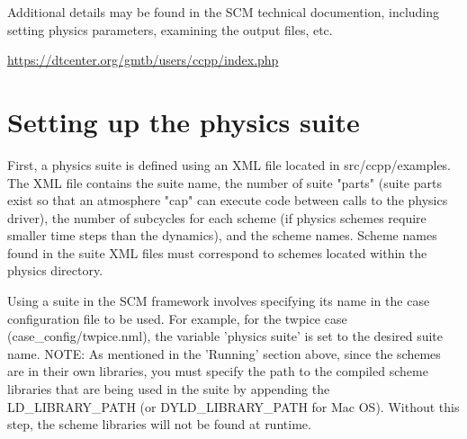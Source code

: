 
Additional details may be found in the SCM technical documention, including setting physics parameters, examining the output files, etc.  

\url{https://dtcenter.org/gmtb/users/ccpp/index.php}


\section{Setting up the physics suite}
First, a physics suite is defined using an XML file located in
src/ccpp/examples. The XML file contains the suite name, the number of suite
"parts" (suite parts exist so that an atmosphere "cap" can execute code between
calls to the physics driver), the number of subcycles for each scheme (if
physics schemes require smaller time steps than the dynamics), and the scheme
names. Scheme names found in the suite XML files must correspond to schemes
located within the physics directory.

Using a suite in the SCM framework involves specifying its name in the case
configuration file to be used. For example, for the twpice case
(case\_config/twpice.nml), the variable 'physics suite' is set to the desired
suite name. NOTE: As mentioned in the 'Running' section above, since the schemes
 are in their own libraries, you must specify the path to the compiled scheme
 libraries that are being used in the suite by appending the LD\_LIBRARY\_PATH
 (or DYLD\_LIBRARY\_PATH for Mac OS). Without this step, the scheme libraries will
  not be found at runtime.


